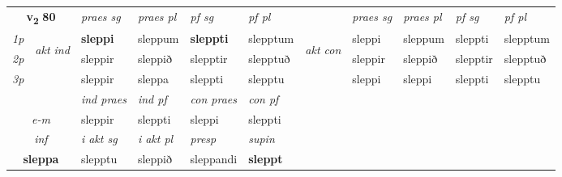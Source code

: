 \noindent
\begin{tabular}{lllllllllll} \toprule
\multicolumn{2}{c}{\textbf{v{\textsubscript{2}}} \Large{\textbf{80}}}  &  \textit{praes sg}  & \textit{praes pl}  &\textit{ pf sg} & \textit{pf pl} &  &  \textit{praes sg}  & \textit{praes pl}  & \textit{pf sg} & \textit{pf pl } \\*
	\cmidrule{3-6} \cmidrule{8-11}
 {\textit{1p}} & \multirow{3}{*}{\begin{turn}{90}\textit{akt ind}\end{turn}} & \textbf{sleppi} & sleppum & \textbf{sleppti} & slepptum & \multirow{3}{*}{\begin{turn}{90}\textit{akt con}\end{turn}} &sleppi & sleppum & sleppti & slepptum\\*
 {\textit{2p}} &  &  sleppir  & sleppið & slepptir & slepptuð & & sleppir & sleppið & slepptir & slepptuð \\*
{\textit{3p}} &  & sleppir & sleppa & sleppti & slepptu & & sleppi & sleppi& sleppti & slepptu \\*
\cmidrule{3-6} \cmidrule{8-11}

   & &  \textit{ind praes} & \textit{ind pf} & \textit{con praes} & \textit{con pf} \\*
\multicolumn{2}{c}{ \textit{e-m} } & sleppir & sleppti & sleppi & sleppti \\*

\cmidrule{3-6}
   \multicolumn{2}{c}{\textit{inf}}  & \textit{i akt sg} & \textit{i akt pl}   & \textit{presp} & \textit{supin}   \\*
  \multicolumn{2}{c}{\textbf{sleppa}} & slepptu  & sleppið   & sleppandi &  \textbf{sleppt}   \\*
\end{tabular}

